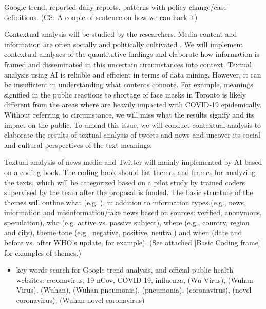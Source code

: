 Google trend, reported daily reports, patterns with policy change/case definitions. (CS: A couple of sentence on how we can hack it)

Contextual analysis will be studied by the researchers.  Media content and information are often socially and politically cultivated \cite{}.  We will implement contextual analyses of the quantitative findings and elaborate how information is framed and disseminated in this uncertain circumstances into context.  Textual analysis using AI is reliable and efficient in terms of data mining.  However, it can be insufficient in understanding what contents connote.  For example, meanings signified in the public reactions to shortage of face masks in Toronto is likely different from  the areas where are heavily impacted with COVID-19 epidemically.  Without referring to circumstance, we will miss what the results signify and its impact on the public.  To amend this issue, we will conduct contextual analysis \citep{} to elaborate the results of textual analysis of tweets and news and uncover its social and cultural perspectives of the text meanings.


Textual analysis of news media and Twitter will mainly implemented by AI based on a coding book.  The coding book should list themes and frames for analyzing the texts, which will be categorized based on a pilot study by trained coders supervised by the team after the proposal is funded.  The basic structure of the themes will outline what (e.g. ), in addition to information types  (e.g., news, information and misinformation/fake news based on sources: verified, anonymous, speculation), who (e.g. active vs. passive subject), where (e.g., country, region and city), theme tone (e.g., negative, positive, neutral) and when (date and before vs. after WHO’s update, for example).
(See  attached [Basic Coding frame] for examples of themes.)

\begin{itemize}
\item{key words search for Google trend analysis, and official public health websites: coronavirus, 19-nCov, COVID-19, influenza, (Wu Virus), (Wuhan Virus), (Wuhan), (Wuhan pneumonia), (pneumonia), (coronavirus), (novel coronavirus), (Wuhan novel coronavirus)}
\end{itemize}

